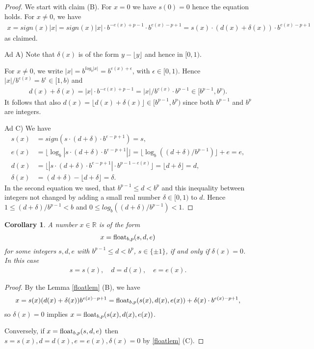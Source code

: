 \documentclass{article}
\theoremstyle{plain}
\newtheorem{corollary}[definition]{Corollary}
\theoremstyle{remark}
\newcommand{\IR}{\mathbb{R}}
\newcommand{\floor}[1]{\lfloor#1\rfloor}
\newcommand{\abs}[1]{|#1|}
\newcommand{\eps}{\epsilon}
\begin{document}
\begin{proof}
  We start with claim (B). For $x=0$ we have $s(0) = 0$ hence the equation holds.
  For $x \neq 0$, we have
  \begin{align*}
    x = sign(x) |x| = sign(x) \abs{x} \cdot b^{-e(x)+p-1} \cdot b^{e(x)-p+1} = s(x) \cdot (d(x) + \delta(x)) \cdot b^{e(x)-p+1}
  \end{align*}
  as claimed.

  Ad A) Note that $\delta(x)$ is of the form $y - \floor{y}$ and hence in $[0,1)$.

  For $x \neq 0$, we write $|x| = b^{log_b|x|} = b^{e(x) + \eps}$, with $\eps \in [0,1)$.
  Hence $\abs{x} / b^{e(x)} = b^\eps \in [1,b)$ and
  \begin{align*}
     d(x) + \delta(x) = \abs{x} \cdot b^{-e(x)+p-1} = \abs{x} / b^{e(x)} \cdot b^{p-1} \in [b^{p-1},b^p).
  \end{align*}
  It follows that also $d(x) = \floor{d(x) + \delta(x)} \in [ b^{p-1}, b^p )$
  since both $b^{p-1}$ and $b^p$ are integers.

  Ad C) We have
  \begin{align*}
    s(x) &= sign(s \cdot (d + \delta) \cdot b^{e-p+1}) = s, \\
    e(x) &= \floor{ \log_b \abs{s \cdot (d + \delta) \cdot b^{e-p+1}} } = \floor{\log_b((d+\delta)/b^{p-1})} + e = e, \\
    d(x) &= \floor{\abs{ s \cdot (d + \delta) \cdot b^{e-p+1} } \cdot b^{p-1-e(x)}} = \floor{d + \delta} = d, \\
    \delta(x) &= (d + \delta) - \floor{d + \delta} = \delta.
  \end{align*}
  In the second equation we used, that $b^{p-1} \leq d < b^p$ and this inequality between integers
  not changed by adding a small real number $\delta \in [0,1)$ to $d$.
  Hence $1 \leq (d+\delta) /  b^{p-1} < b$ and $0 \leq log_b((d+\delta) /  b^{p-1}) < 1$.
\end{proof}

\begin{corollary}
  A number $x \in \IR$ is of the form
  \begin{align*}
    x = \mathrm{float}_{b,p}(s,d,e)
  \end{align*}
  for some integers $s,d,e$ with $b^{p-1} \leq d < b^p$, $s \in \{\pm 1\}$, if and only if $\delta(x) = 0$.
  In this case
  \begin{align*}
    s = s(x), \quad d = d(x), \quad e = e(x).
  \end{align*}
\end{corollary}
\begin{proof}
  By the Lemma \ref{floatlem} (B), we have
  \begin{align*}
    x = s(x) (d(x) + \delta(x)) b^{e(x)-p+1} = \mathrm{float}_{b,p}(s(x), d(x), e(x)) + \delta(x) \cdot b^{e(x) - p + 1},
  \end{align*}
  so $\delta(x) = 0$ implies $x = \mathrm{float}_{b,p}(s(x),d(x),e(x))$.

  Conversely, if $x = \mathrm{float}_{b,p}(s,d,e)$ then $s = s(x), d = d(x), e = e(x), \delta(x) = 0$ by \ref{floatlem} (C).
\end{proof}
\end{document}
